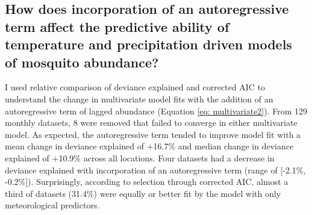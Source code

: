 \begin{comment}
\textbf{Total P} & \textcolor{white}{T}\quad 4 &  \textcolor{white}{T}\quad 4 & %
\textcolor{white}{T}\quad 1 & \textcolor{white}{T}\quad 1 &
\textcolor{white}{T}\quad 4 &
\textcolor{white}{T}\quad 4 \\\hline

\textbf{Total T} & 4
\quad \textcolor{white}{P} & 3 \quad \textcolor{white}{P} %
& 3 \quad \textcolor{white}{P} & 5 \quad \textcolor{white}{P} & 4 \quad \textcolor{white}{P} & 3 \quad \textcolor{white}{P} \\\hline

\multicolumn{7}{l}{}\\

\multicolumn{7}{l}{\textit{Aedes\textsuperscript{1} = Aedes atlanticus tormentor morphological group; Aedes\textsuperscript{2} = Aedes albopictus;}}\\

\multicolumn{7}{l}{\textit{Anopheles\textsuperscript{1} = Anopheles quadrimaculatus; Culex\textsuperscript{1} = Culex pipiens morphological group;}}\\

\multicolumn{7}{l}{\textit{Culex\textsuperscript{2} = Culex nigripalpus; Culiseta\textsuperscript{1} = Culiseta melanura}} \\

\end{tabularx}

\label{tab: compare_sites}
\end{center}
\end{table}
\end{comment}

\subsection{How does incorporation of an autoregressive term affect the predictive ability of temperature and precipitation driven models of mosquito abundance?}

I used relative comparison of deviance explained and corrected AIC to understand the change in multivariate model fits with the addition of an autoregressive term of lagged abundance (Equation \ref{eq: multivariate2}). From 129 monthly datasets, 8 were removed that failed to converge in either multivariate model. As expected, the autoregressive term tended to improve model fit with a mean change in deviance explained of +16.7\% and median change in deviance explained of +10.9\% across all locations. Four datasets had a decrease in deviance explained with incorporation of an autoregressive term (range of [-2.1\%, -0.2\%]). Surprisingly, according to selection through corrected AIC, almost a third of datasets (31.4\%) were equally or better fit by the model with only meteorological predictors.

